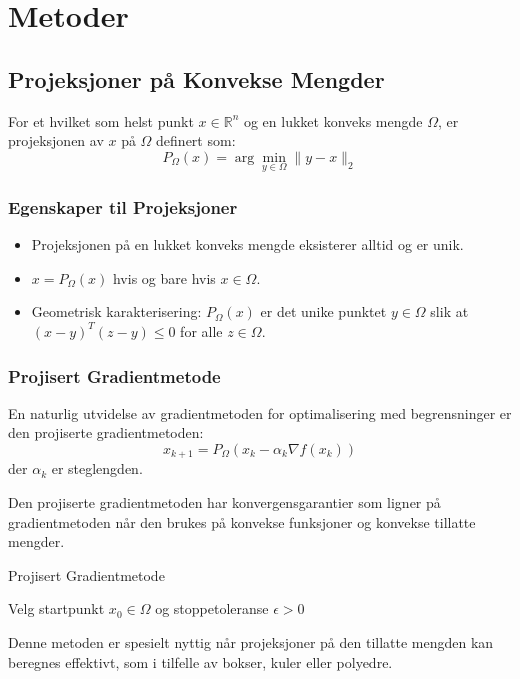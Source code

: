 \chapter{Metoder}
\label{sec:convex_optimization_methods}

\section{Projeksjoner på Konvekse Mengder}
For et hvilket som helst punkt \( x \in \mathbb{R}^n \) og en lukket konveks mengde \( \Omega \), er projeksjonen av \( x \) på \( \Omega \) definert som:
\[
	P_\Omega(x) = \arg\min_{y \in \Omega} \|y - x\|_2
\]

\subsection{Egenskaper til Projeksjoner}
\begin{itemize}
	\item Projeksjonen på en lukket konveks mengde eksisterer alltid og er unik.
	\item \( x = P_\Omega(x) \) hvis og bare hvis \( x \in \Omega \).
	\item Geometrisk karakterisering: \( P_\Omega(x) \) er det unike punktet \( y \in \Omega \) slik at \( (x - y)^T(z - y) \leq 0 \) for alle \( z \in \Omega \).
\end{itemize}

\subsection{Projisert Gradientmetode}
En naturlig utvidelse av gradientmetoden for optimalisering med begrensninger er den projiserte gradientmetoden:
\[
	x_{k+1} = P_\Omega(x_k - \alpha_k \nabla f(x_k))
\]
der \( \alpha_k \) er steglengden.

Den projiserte gradientmetoden har konvergensgarantier som ligner på gradientmetoden når den brukes på konvekse funksjoner og konvekse tillatte mengder.

\begin{algorithm}[H]
	\caption{Projisert Gradientmetode}
	Velg startpunkt \( x_0 \in \Omega \) og stoppetoleranse \( \epsilon > 0 \)\;
\end{algorithm}

Denne metoden er spesielt nyttig når projeksjoner på den tillatte mengden kan beregnes effektivt, som i tilfelle av bokser, kuler eller polyedre.

